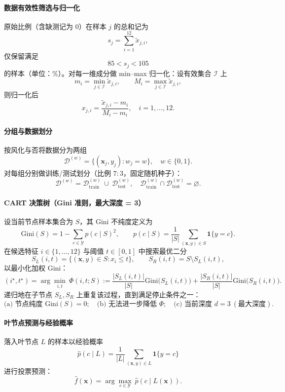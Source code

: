 \documentclass[withoutpreface,bwprint]{cumcmthesis}
\begin{document}
\paragraph{数据有效性筛选与归一化}
原始比例（含缺测记为 0）在样本 $j$ 的总和记为
\[
s_j=\sum_{i=1}^{12} \tilde{x}_{j,i},
\]
仅保留满足
\[
85 < s_j < 105
\]
的样本（单位：\%）。对每一维成分做 min--max 归一化：设有效集合 $\mathcal{I}$ 上
\[
m_i=\min_{j\in\mathcal{I}}\tilde{x}_{j,i},\qquad M_i=\max_{j\in\mathcal{I}}\tilde{x}_{j,i},
\]
则归一化后
\[
x_{j,i}=\frac{\tilde{x}_{j,i}-m_i}{M_i-m_i},\quad i=1,\ldots,12.
\]

\paragraph{分组与数据划分}
按风化与否将数据分为两组
\[
\mathcal{D}^{(w)}=\{(\mathbf{x}_j,y_j): w_j=w\},\quad w\in\{0,1\}.
\]
对每组分别做训练/测试划分（比例 $7:3$，固定随机种子）：
\[
\mathcal{D}^{(w)}=\mathcal{D}^{(w)}_{\mathrm{train}}\ \cup\ \mathcal{D}^{(w)}_{\mathrm{test}},\quad 
\mathcal{D}^{(w)}_{\mathrm{train}}\cap\mathcal{D}^{(w)}_{\mathrm{test}}=\varnothing.
\]

\paragraph{CART 决策树（Gini 准则，最大深度 = 3）}
设当前节点样本集合为 $S$，其 Gini 不纯度定义为
\[
\mathrm{Gini}(S)=1-\sum_{c\in\mathcal{Y}} p(c\mid S)^2,\qquad 
p(c\mid S)=\frac{1}{|S|}\sum_{(\mathbf{x},y)\in S}\mathbf{1}\{y=c\}.
\]
在候选特征 $i\in\{1,\ldots,12\}$ 与阈值 $t\in[0,1]$ 中搜索最优二分
\[
S_L(i,t)=\{(\mathbf{x},y)\in S: x_i\le t\},\qquad S_R(i,t)=S\setminus S_L(i,t),
\]
以最小化加权 Gini：
\[
(i^\star,t^\star)=\arg\min_{i,t}\ 
\Phi(i,t;S):=\frac{|S_L(i,t)|}{|S|}\mathrm{Gini}\big(S_L(i,t)\big)
+\frac{|S_R(i,t)|}{|S|}\mathrm{Gini}\big(S_R(i,t)\big).
\]
递归地在子节点 $S_L,S_R$ 上重复该过程，直到满足停止条件之一：
\[
\text{(a) 节点纯度 } \mathrm{Gini}(S)=0;\quad
\text{(b) 无法进一步降低 }\Phi;\quad
\text{(c) 当前深度 } d=3\ (\text{最大深度}).
\]

\paragraph{叶节点预测与经验概率}
落入叶节点 $L$ 的样本以经验概率
\[
\hat{p}(c\mid L)=\frac{1}{|L|}\sum_{(\mathbf{x},y)\in L}\mathbf{1}\{y=c\}
\]
进行投票预测：
\[
\hat{f}(\mathbf{x})=\arg\max_{c\in\mathcal{Y}}\ \hat{p}(c\mid L(\mathbf{x})).
\]
\end{document}

